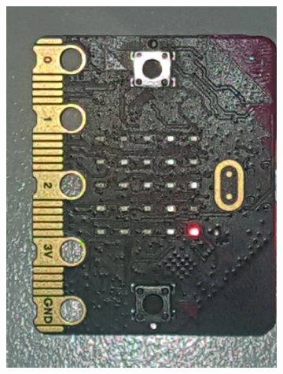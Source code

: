 		\begin{figure}[h!]
		\begin{subfigure}[b]{0.19\textwidth}
			\includegraphics[width=.98\linewidth]{figuren/matrix/mEen}
   

\end{subfigure}
\end{figure}

